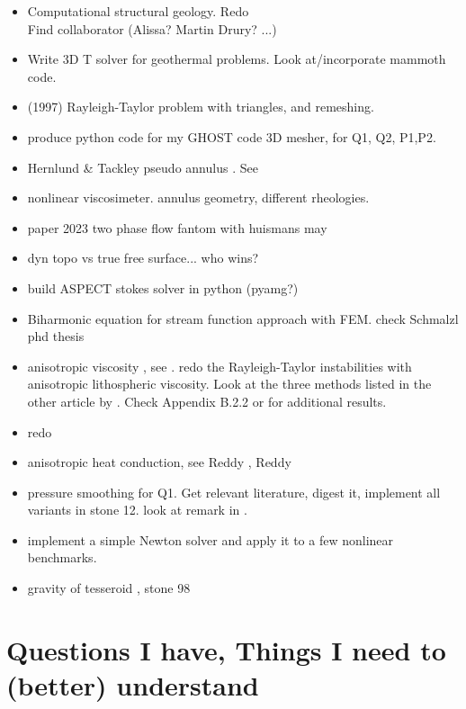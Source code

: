 \documentclass[a4paper]{article}
\begin{document}
\begin{itemize}
\item Computational structural geology. Redo  \\
Find collaborator (Alissa? Martin Drury? ...)
\item Write 3D T solver for geothermal problems. Look at/incorporate
mammoth code.
\item \textcite{vaks97} (1997) Rayleigh-Taylor problem with triangles, and remeshing.
\item produce python code for my GHOST code \textcite{thie18} 3D mesher, for Q1, Q2, P1,P2.
\item Hernlund \& Tackley pseudo annulus . See \textcite{josv21}
\item nonlinear viscosimeter. annulus geometry, different rheologies.
\item paper 2023 two phase flow fantom with huismans may
\item dyn topo vs true free surface... who wins?
\item build ASPECT stokes solver in python (pyamg?)
\item Biharmonic equation for stream function approach with FEM. check Schmalzl phd thesis
\item anisotropic viscosity , see \textcite{leha08}.
redo the Rayleigh-Taylor instabilities with 
anisotropic lithospheric viscosity.
Look at the three methods listed in the other article by \textcite{leha08b}. 
Check Appendix B.2.2 or \textcite{perr19} for additional results.

\item redo 
\item anisotropic heat conduction, see  Reddy \cite[p121]{reddybook2}, Reddy \cite[p143]{reddybook2} 
\item pressure smoothing for Q1. Get relevant literature, digest it, implement all variants in stone 12.
look at remark in \textcite{lumh24}.

\item implement a simple Newton solver and apply it to a few nonlinear  benchmarks. 

\item gravity of tesseroid , stone 98

\end{itemize}

\newpage
\section{Questions I have, Things I need to (better) understand}
\end{document}
